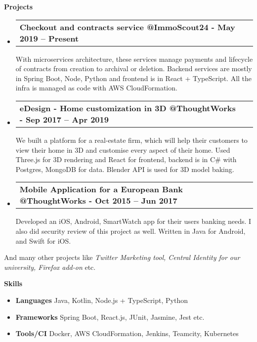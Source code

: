 \documentclass[letterpaper,12pt]{article}[leftmargin=*]
\makeatletter
\def \entryspacing {-0pt}
\renewcommand{\section}[2]{\vspace{5pt}
  \colorbox{secondary}{\color{white}\raggedbottom\normalsize\textbf{{#1}{\hspace{7pt}#2}}}
}
\newcommand{\resumeEntryStart}{\begin{itemize}[leftmargin=2.5mm]}
\newcommand{\resumeEntryEnd}{\end{itemize}\vspace{\entryspacing}}
\newcommand{\resumeEntryTD}[2]{
  \vspace{-1pt}\item[]
    \begin{tabularx}{0.97\textwidth}{X@{\hspace{60pt}}r}
      \textbf{\color{primary}#1} & {\firabook\color{accent}\small#2} \\
    \end{tabularx}\vspace{-6pt}
}
\newcommand{\resumeEntryS}[2]{
  \item[]\small{
    \textbf{\color{primary}#1 }{ #2 \vspace{-6pt}}
  }
}
\makeatother
\begin{document}
\section{\faFlask}{Projects}

  \resumeEntryStart
    \resumeEntryTD
      {Checkout and contracts service @ImmoScout24 {\normalfont - May 2019 -- Present}}{}
      \begin{flushleft}\small
      With microservices architecture, these services manage payments and lifecycle of contracts from creation to archival or deletion. Backend services are mostly in Spring Boot, Node, Python and frontend is in React + TypeScript. All the infra is managed as code with AWS CloudFormation.
      \end{flushleft}
  \resumeEntryEnd

  \resumeEntryStart
    \resumeEntryTD
      {eDesign - Home customization in 3D @ThoughtWorks {\normalfont - Sep 2017 -- Apr 2019}}{}
      \begin{flushleft}\small
      We built a platform for a real-estate firm, which will help their customers to view their home in 3D and customise every aspect of their home. Used Three.js for 3D rendering and React for frontend, backend is in C\# with Postgres, MongoDB for data. Blender API is used for 3D model baking.
      \end{flushleft}
  \resumeEntryEnd

  \resumeEntryStart
    \resumeEntryTD
      {Mobile Application for a European Bank @ThoughtWorks {\normalfont - Oct 2015 -- Jun 2017}}{}
    \begin{flushleft}\small
    Developed an iOS, Android, SmartWatch app for their users banking needs. I also did security review of this project as well. Written in Java for Android, and Swift for iOS.
    \end{flushleft}
  \resumeEntryEnd

  \begin{adjustwidth}{2.5mm}{2.5mm}\small
  {And many other projects like \textit{Twitter Marketing tool, Central Identity for our university, Firefox add-on} etc.}
  \end{adjustwidth}
  \vspace{4pt}

\section{\faGears}{Skills}
  \resumeEntryStart
  \resumeEntryS{Languages} {Java, Kotlin, Node.js + TypeScript, Python}
  \resumeEntryS{Frameworks} {Spring Boot, React.js, JUnit, Jasmine, Jest etc.}
  \resumeEntryS{Tools/CI} {Docker, AWS CloudFormation, Jenkins, Teamcity, Kubernetes}
  \resumeEntryEnd
\end{document}
